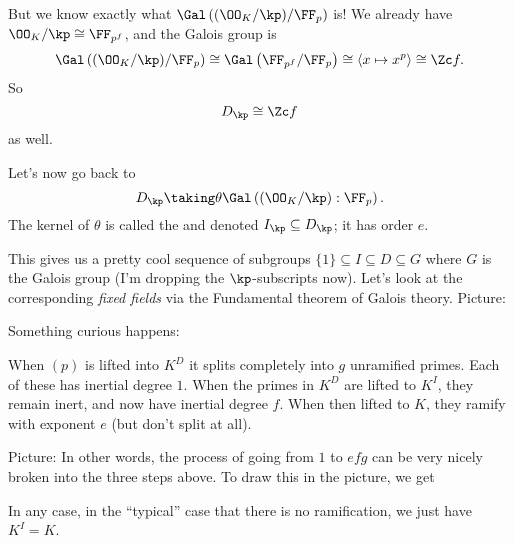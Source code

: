 But we know exactly what $\Gal\left( (\OO_K/\kp)/\FF_p \right)$ is!
We already have $ \OO_K / \kp \cong \FF_{p^f} $, and the Galois group is
\[
	\Gal\left( (\OO_K/\kp) / \FF_p \right)
	\cong \Gal\left( \FF_{p^f} / \FF_p \right)
	\cong \left< x \mapsto x^p \right>
	\cong \Zc f.
\]
So \[ D_\kp \cong \Zc f \] as well.

Let's now go back to
\[ D_\kp \taking\theta \Gal\left( (\OO_K/\kp) : \FF_p \right). \]
The kernel of $\theta$ is called the 
and denoted $I_\kp \subseteq D_\kp$; it has order $e$.

This gives us a pretty cool sequence of subgroups
$\{1\} \subseteq I \subseteq D \subseteq G$
where $G$ is the Galois group (I'm dropping the $\kp$-subscripts now).
Let's look at the corresponding \emph{fixed fields} via the Fundamental theorem of Galois theory.
Picture:
\begin{center}
\end{center}
Something curious happens:
\begin{itemize}
	\ii When $(p)$ is lifted into $K^D$ it splits completely into $g$ unramified primes.
	Each of these has inertial degree $1$.
	\ii When the primes in $K^D$ are lifted to $K^I$, they remain inert, and now have
	inertial degree $f$.
	\ii When then lifted to $K$, they ramify with exponent $e$ (but don't split at all).
\end{itemize}
Picture:
In other words, the process of going from $1$ to $efg$
can be very nicely broken into the three steps above.
To draw this in the picture, we get
\begin{center}
\end{center}
In any case, in the ``typical'' case that there is no ramification,
we just have $K^I = K$.

